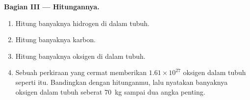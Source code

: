 \begin{problem}
\medskip
\noindent\textbf{Bagian III --- Hitungannya.}
\begin{enumerate}[resume]
  \item Hitung banyaknya  hidrogen di dalam tubuh.
  \item Hitung banyaknya  karbon.
  \item Hitung banyaknya  oksigen di dalam tubuh.
  \item Sebuah perkiraan yang cermat memberikan $1.61 \times 10^{27}$
         oksigen dalam tubuh seperti itu. Bandingkan dengan hitunganmu,
        lalu nyatakan banyaknya  oksigen dalam tubuh seberat
        \qty{70}{kg} sampai dua angka penting.
\end{enumerate}
\end{problem}
